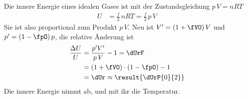 Die innere Energie eines idealen Gases ist mit der Zustandsgleichung $p\,V = nRT$
\begin{align}
 U &= \frac{f}{2}\,nRT = \frac{f}{2}\,p\,V
\end{align}
Sie ist also proportional zum Produkt $p\,V$. Neu ist $V' = \left(1+\fVO\right)V$ und $p' = \left(1-\fpO\right)p$, die relative Änderung ist
\begin{align}
 \frac{\Delta U}{U} &= \frac{p'V'}{p\,V}-1 = \dUrF \\
   &= \left(1+\fVO\right)\cdot\left(1-\fpO\right)-1 \\
   &= \dUr \approx \result{\dUrP{0}{2}}
\end{align}
Die innere Energie nimmt ab, und mit ihr die Temperatur.
